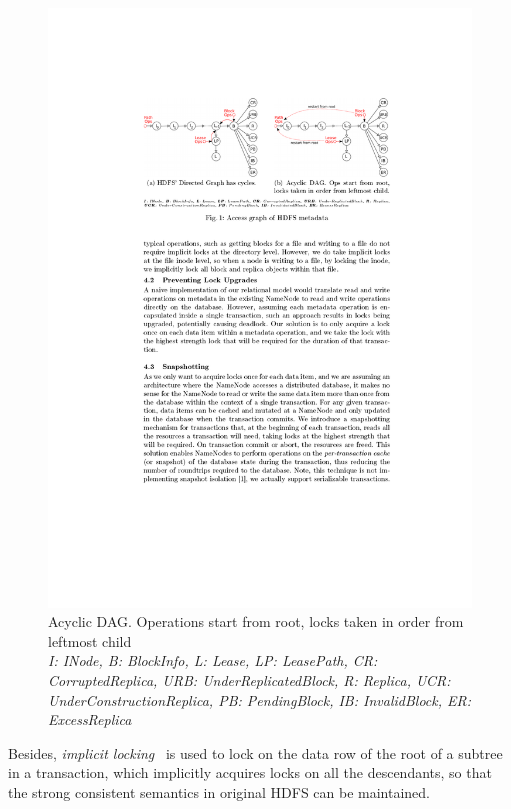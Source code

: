 \begin{figure}[h]
	\centering
	\includegraphics[scale=2]{figs/dag.pdf}
	\caption{Acyclic DAG. Operations start from root, locks taken in order from leftmost child \protect \cite{hakimzadeh2014scaling} 
		\\ \textit{I: INode, B: BlockInfo, L: Lease, LP: LeasePath, CR: CorruptedReplica, URB: UnderReplicatedBlock, R: Replica, UCR: UnderConstructionReplica, PB: PendingBlock, IB: InvalidBlock, ER: ExcessReplica}}
	\label{fig:dag}
\end{figure}

\noindent Besides, \textit{implicit locking}~\cite{gray1976granularity} is used to lock on the data row of the root of a subtree in a transaction, which implicitly acquires locks on all the descendants, so that the strong consistent semantics in original HDFS can be maintained.

